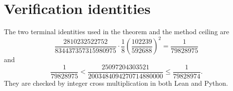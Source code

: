 \documentclass[11pt,reqno]{amsart}
\theoremstyle{definition}
\theoremstyle{remark}
\begin{document}
\section{Verification identities}
\enlargethispage{5\baselineskip}

The two terminal identities used in the theorem and the method ceiling are
\[
 \frac{2810232522752}{834437357315980975}\cdot\frac18
 \left(\frac{102239}{592688}\right)^2
 =\frac1{79828975}
\]
and
\[
 \frac1{79828975}<
 \frac{25097204303521}{2003484094270714880000}
 \le\frac1{79828974}.
\]
They are checked by integer cross multiplication in both Lean and Python.
\end{document}
